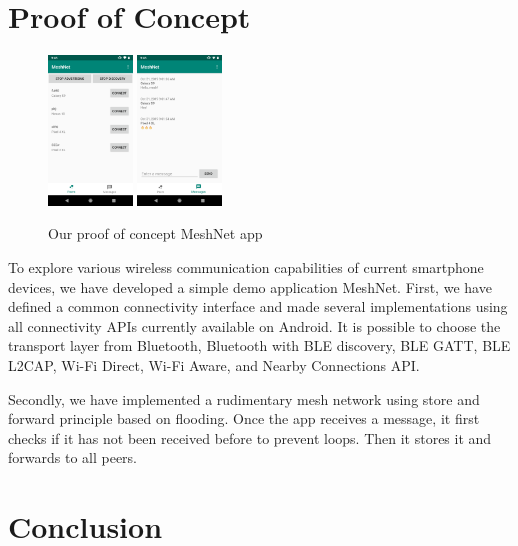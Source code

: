 \documentclass[conference,compsoc]{IEEEtran}
\begin{document}



\section{Proof of Concept} \label{poc}

\begin{figure}[h]
  \centering
  \includegraphics[width=0.2\textwidth]{meshnet1} \includegraphics[width=0.2\textwidth]{meshnet2} 
  \caption{Our proof of concept MeshNet app}
\end{figure}


To explore various wireless communication capabilities of current smartphone devices, we have developed a simple demo application MeshNet. First, we have defined a common connectivity interface and made several implementations using all connectivity APIs currently available on Android. It is possible to choose the transport layer from Bluetooth, Bluetooth with BLE discovery, BLE GATT, BLE L2CAP, Wi-Fi Direct, Wi-Fi Aware, and Nearby Connections API.

Secondly, we have implemented a rudimentary mesh network using store and forward principle based on flooding. Once the app receives a message, it first checks if it has not been received before to prevent loops. Then it stores it and forwards to all peers.

\section{Conclusion} \label{conclusion}



\end{document}

